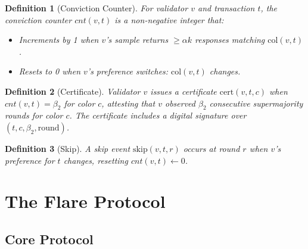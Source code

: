 \documentclass[11pt,a4paper]{article}
\newtheorem{definition}{Definition}[section]
\begin{document}
\begin{definition}[Conviction Counter]
For validator $v$ and transaction $t$, the conviction counter $cnt(v, t)$ is a
non-negative integer that:
\begin{itemize}[nosep]
\item Increments by 1 when $v$'s sample returns $\geq \alpha k$ responses matching
$\text{col}(v, t)$.
\item Resets to 0 when $v$'s preference switches: $\text{col}(v, t)$ changes.
\end{itemize}
\end{definition}

\begin{definition}[Certificate]
Validator $v$ issues a certificate $\text{cert}(v, t, c)$ when $cnt(v, t) = \beta_2$
for color $c$, attesting that $v$ observed $\beta_2$ consecutive supermajority rounds
for color $c$. The certificate includes a digital signature over
$(t, c, \beta_2, \text{round})$.
\end{definition}

\begin{definition}[Skip]
A skip event $\text{skip}(v, t, r)$ occurs at round $r$ when $v$'s preference for $t$
changes, resetting $cnt(v, t) \gets 0$.
\end{definition}

\section{The Flare Protocol}
\label{sec:protocol}

\subsection{Core Protocol}
\end{document}

